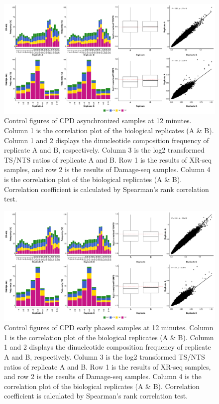 \begin{figure}[H]
\begin{center}
\includegraphics[width=\textwidth]{Chapters/7_appendix/figures/supfig5}
\caption[Control figures of CPD asynchronized samples at 12 minutes.]{Control figures of CPD asynchronized samples at 12 minutes. Column 1 is the correlation plot of the biological replicates (A \& B). Column 1 and 2 displays the dinucleotide composition frequency of replicate A and B, respectively. Column 3 is the log2 transformed TS/NTS ratios of replicate A and B. Row 1 is the results of XR-seq samples, and row 2 is the results of Damage-seq samples. Column 4 is the correlation plot of the biological replicates (A \& B). Correlation coefficient is calculated by Spearman’s rank correlation test.}
\label{supfig:control4}
\end{center}
\end{figure}


\begin{figure}[H]
\begin{center}
\includegraphics[width=\textwidth]{Chapters/7_appendix/figures/supfig6}
\caption[Control figures of CPD early phased samples at 12 minutes.]{Control figures of CPD early phased samples at 12 minutes. Column 1 is the correlation plot of the biological replicates (A \& B). Column 1 and 2 displays the dinucleotide composition frequency of replicate A and B, respectively. Column 3 is the log2 transformed TS/NTS ratios of replicate A and B. Row 1 is the results of XR-seq samples, and row 2 is the results of Damage-seq samples. Column 4 is the correlation plot of the biological replicates (A \& B). Correlation coefficient is calculated by Spearman’s rank correlation test.}
\label{supfig:control5}
\end{center}
\end{figure}



